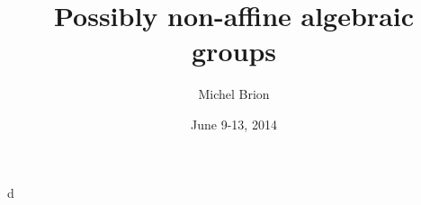 \documentclass{article}
\title{Possibly non-affine algebraic groups}
\author{Michel Brion}
\date{June 9-13, 2014}
\begin{document}
\maketitle





d
\end{document}
